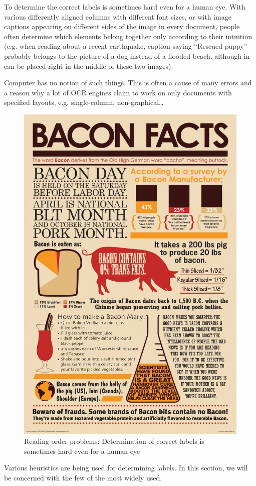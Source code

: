 To determine the correct labels is sometimes hard even for a human eye. With various differently aligned columns with different font sizes, or with image captions appearing on different sides of the image in every document, people often determine which elements belong together only according to their intuition (e.g. when reading about a recent earthquake, caption saying “Rescued puppy” probably belongs to the picture of a dog instead of a flooded beach, although in can be placed right in the middle of these two images).

Computer has no notion of such things. This is often a cause of many errors and a reason why a lot of OCR engines claim to work on only documents with specified layouts, e.g. single-column, non-graphical\ldots

\begin{figure}[H]
\centering
\includegraphics[width=0.5\linewidth]{img/tableDetection/readingOrderIssue.jpg}
\caption{Reading order problems: Determination of correct labels is sometimes hard even for a human eye} \label{fig:1a}
\end{figure}

Various heuristics are being used for determining labels\cite{logicalLayoutTemplate}. In this section, we will be concerned with the few of the most widely used.


